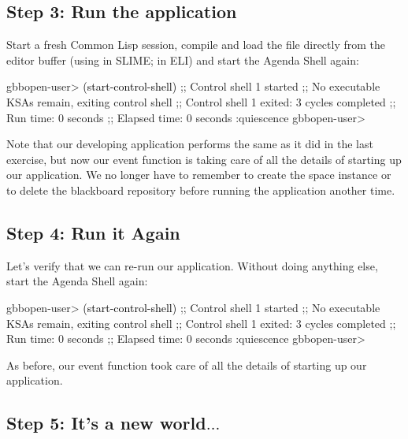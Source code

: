 \documentclass[10pt,twoside,english,pdftex]{article}
\begin{document}
\subsection*{Step 3: Run the application}

%
%
Start a fresh Common Lisp session, compile and load the
 file directly from the editor buffer
(using  in SLIME;  in ELI) and start
the Agenda Shell again:
%
\W\supp
\begin{example}
\textcolor{darkergray}{%
  gbbopen-user> \textcolor{black}{(start-control-shell)}
  ;; Control shell 1 started
  ;; No executable KSAs remain, exiting control shell
  ;; Control shell 1 exited: 3 cycles completed
  ;; Run time: 0 seconds
  ;; Elapsed time: 0 seconds
  :quiescence
  gbbopen-user>}
\end{example}

Note that our developing application performs the same as it did in the last
exercise, but now our  event function is taking
care of all the details of starting up our application.  We no longer have to
remember to create the  space instance or to delete
the blackboard repository before running the application another time.

\subsection*{Step 4: Run it Again}

%
%
Let's verify that we can re-run our application. Without doing anything else,
start the Agenda Shell again:
%
\W\supp
\begin{example}
\textcolor{darkergray}{%
  gbbopen-user> \textcolor{black}{(start-control-shell)}
  ;; Control shell 1 started
  ;; No executable KSAs remain, exiting control shell
  ;; Control shell 1 exited: 3 cycles completed
  ;; Run time: 0 seconds
  ;; Elapsed time: 0 seconds
  :quiescence
  gbbopen-user>}
\end{example}

As before, our  event function took care of all
the details of starting up our application.

\subsection*{Step 5: It's a new world$\ldots$}
\end{document}
